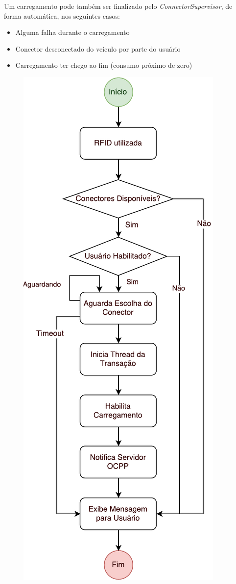       Um carregamento pode também ser finalizado pelo \textit{ConnectorSupervisor}, de forma automática, nos seguintes casos: 

      \begin{itemize}
        \item Alguma falha durante o carregamento
        \item Conector desconectado do veículo por parte do usuário
        \item Carregamento ter chego ao fim (consumo próximo de zero)
      \end{itemize}

      \begin{figure}[H]
        \begin{center}
          \includegraphics[height=0.8\textheight]{assets/pdfs/sw-starttransaction.pdf}

\end{center}
\end{figure}
